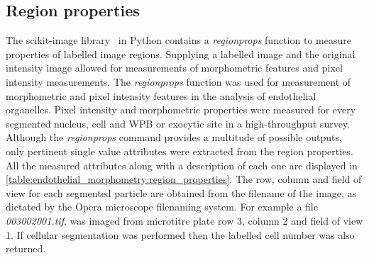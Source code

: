 \subsection{Region properties}
\label{endothelial_morphometry:morphometric_measurements}
The scikit-image library~\cite{VanderWalt2014} in Python contains a \emph{regionprops} function to measure properties of labelled image regions. Supplying a labelled image and the original intensity image allowed for measurements of morphometric features and pixel intensity measurements. The \emph{regionprops} function was used for measurement of morphometric and pixel intensity features in the analysis of endothelial organelles. Pixel intensity and morphometric properties were measured for every segmented nucleus, cell and WPB or exocytic site in a high-throughput survey. Although the \emph{regionprops} command provides a multitude of possible outputs, only pertinent single value attributes were extracted from the region properties. All the measured attributes along with a description of each one are displayed in \autoref{table:endothelial_morphometry:region_properties}. The row, column and field of view for each segmented particle are obtained from the filename of the image, as dictated by the Opera microscope filenaming system. For example a file \emph{003002001.tif}, was imaged from microtitre plate row 3, column 2 and field of view 1. If cellular segmentation was performed then the labelled cell number was also returned.

